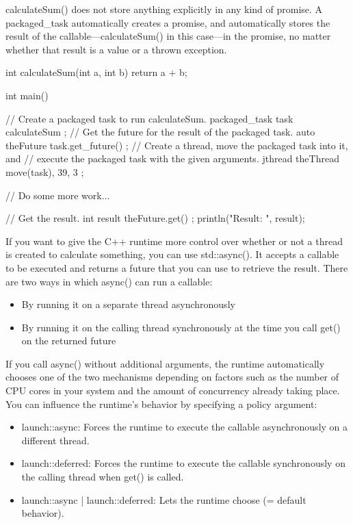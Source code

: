 calculateSum() does not store anything explicitly in any kind of promise. A packaged\_task automatically creates a promise, and automatically stores the result of the callable—calculateSum() in this case—in the promise, no matter whether that result is a value or a thrown exception.

\begin{cpp}
int calculateSum(int a, int b) { return a + b; }

int main()
{
    // Create a packaged task to run calculateSum.
    packaged_task task { calculateSum };
    // Get the future for the result of the packaged task.
    auto theFuture { task.get_future() };
    // Create a thread, move the packaged task into it, and
    // execute the packaged task with the given arguments.
    jthread theThread { move(task), 39, 3 };

    // Do some more work...

    // Get the result.
    int result { theFuture.get() };
    println("Result: {}", result);
}
\end{cpp}


If you want to give the C++ runtime more control over whether or not a thread is created to calculate something, you can use std::async(). It accepts a callable to be executed and returns a future that you can use to retrieve the result. There are two ways in which async() can run a callable:

\begin{itemize}
\item
By running it on a separate thread asynchronously

\item
By running it on the calling thread synchronously at the time you call get() on the returned future
\end{itemize}

If you call async() without additional arguments, the runtime automatically chooses one of the two mechanisms depending on factors such as the number of CPU cores in your system and the amount of concurrency already taking place. You can influence the runtime’s behavior by specifying a policy argument:

\begin{itemize}
\item
launch::async: Forces the runtime to execute the callable asynchronously on a different thread.

\item
launch::deferred: Forces the runtime to execute the callable synchronously on the calling thread when get() is called.

\item
launch::async | launch::deferred: Lets the runtime choose (= default behavior).
\end{itemize}

